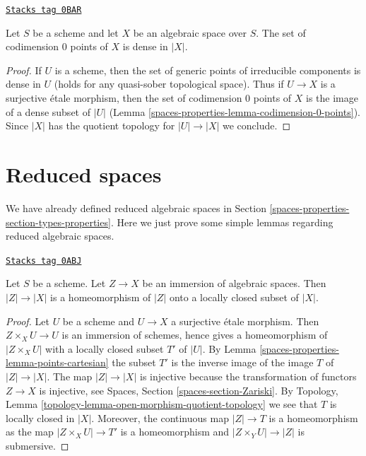 \begin{lemma}
\label{spaces-properties-lemma-codimension-0-points-dense}
\href{https://stacks.math.columbia.edu/tag/0BAR}{\texttt{Stacks tag 0BAR}}

Let $S$ be a scheme and let $X$ be an algebraic space over $S$.
The set of codimension $0$ points of $X$ is dense in $|X|$.
\end{lemma}

\begin{proof}
If $U$ is a scheme, then the set of generic points of irreducible
components is dense in $U$ (holds for any quasi-sober topological space).
Thus if $U \to X$ is a surjective \'etale morphism, then the set
of codimension $0$ points of $X$ is the image of a dense subset of
$|U|$ (Lemma \ref{spaces-properties-lemma-codimension-0-points}). Since $|X|$ has the
quotient topology for $|U| \to |X|$ we conclude.
\end{proof}

\section{Reduced spaces}
\label{spaces-properties-section-reduced}
We have already defined reduced algebraic spaces in
Section \ref{spaces-properties-section-types-properties}.
Here we just prove some simple lemmas regarding reduced algebraic
spaces.

\begin{lemma}
\label{spaces-properties-lemma-subspace-induced-topology}
\href{https://stacks.math.columbia.edu/tag/0ABJ}{\texttt{Stacks tag 0ABJ}}

Let $S$ be a scheme. Let $Z \to X$ be an immersion of algebraic spaces.
Then $|Z| \to |X|$ is a homeomorphism of $|Z|$ onto a locally closed subset
of $|X|$.
\end{lemma}

\begin{proof}
Let $U$ be a scheme and $U \to X$ a surjective \'etale morphism.
Then $Z \times_X U \to U$ is an immersion of schemes, hence gives a
homeomorphism of $|Z \times_X U|$ with a locally closed subset $T'$
of $|U|$. By Lemma \ref{spaces-properties-lemma-points-cartesian} the subset
$T'$ is the inverse image of the image $T$ of $|Z| \to |X|$.
The map $|Z| \to |X|$ is injective because the transformation of
functors $Z \to X$ is injective, see
Spaces, Section \ref{spaces-section-Zariski}. By
Topology, Lemma \ref{topology-lemma-open-morphism-quotient-topology}
we see that $T$ is locally closed in $|X|$. Moreover, the continuous
map $|Z| \to T$ is a homeomorphism as the map $|Z \times_X U| \to T'$
is a homeomorphism and $|Z \times_Y U| \to |Z|$ is submersive.
\end{proof}

